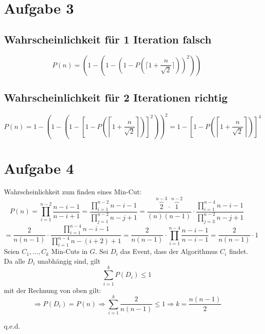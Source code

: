 \documentclass[a4paper,11pt,twoside]{scrartcl}
\newcommand{\qed}{%
	\begin{flushright}
		q.e.d.
	\end{flushright}%
	}
\begin{document}
\section{Aufgabe 3}
\subsection{Wahrscheinlichkeit für 1 Iteration falsch}
\[ P(n) = \left( 1-\left( 1- \left( 1- P\left(\lceil1+\frac{n}{\sqrt{2}} \rceil\right) \right)^2 \right) \right)\]
\subsection{Wahrscheinlichkeit für 2 Iterationen richtig}

\[ P(n) = 1- \left( 1-\left( 1- \left[ 1- P\left(\left\lceil1+\frac{n}{\sqrt{2}} \right\rceil\right) \right]^2 \right) \right)^2 = 1-\left[ 1- P\left(\left\lceil1+\frac{n}{\sqrt{2}} \right\rceil\right) \right]^4
\]
\section{Aufgabe 4}
Wahrscheinlichkeit zum finden eines Min-Cut:
\[ P(n) = \prod_{i=1}^{n-2} \frac{n-i-1}{n-i+1} = \frac{\prod_{i=1}^{n-2} n-i-1}{\prod_{j=1}^{n-2}n - j + 1} = \frac{\overset{n-3}{\overbrace{2}} \cdot \overset{n-2}{\overbrace{1}}}{(n)(n-1)} \cdot \frac{\prod_{i = 1}^{n-4} n - i - 1}{\prod_{j = 3}^{n - 2} n - j + 1}\]
\[ = \frac{2}{n(n-1)} \cdot \frac{\prod_{i = 1}^{n-4} n - i - 1}{\prod_{i = 1}^{n - 4} n - (i + 2) + 1}= \frac{2}{n(n-1)} \cdot \prod_{i = 1}^{n-4}\frac{ n - i - 1}{ n - i - 1} = \frac{2}{n(n-1)}\cdot 1 \]
Seien $C_1,\ldots,C_k$ Min-Cuts in $G$. Sei $D_i$ das Event, dass der Algorithmus $C_i$ findet. Da alle  $D_i$ unabhängig sind, gilt
\[ \sum_{i=1}^{k}P(D_i) \leq 1 \]
mit der Rechnung von oben gilt:
\[ \Rightarrow P(D_i) = P(n) \Rightarrow \sum_{i=1}^{k} \frac{2}{n(n-1)} \leq 1 \Rightarrow k = \frac{n(n-1)}{2} \]
\qed
\end{document}
